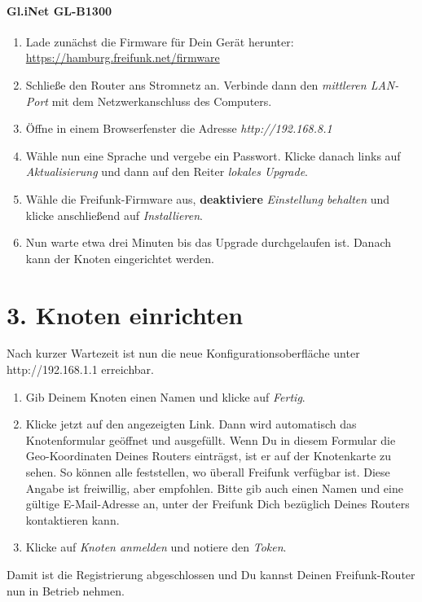 \documentclass[10pt,a4paper,notumble]{leaflet}
\begin{document}
\paragraph{Gl.iNet GL-B1300}
\begin{enumerate}
 \item Lade zunächst die Firmware für Dein Gerät herunter: \mbox{\href{https://hamburg.freifunk.net/firmware}{https://hamburg.freifunk.net/firmware}}
 \item Schließe den Router ans Stromnetz an. Verbinde dann den \textit{mittleren LAN-Port} mit dem Netzwerkanschluss des Computers.
 \item Öffne in einem Browserfenster die Adresse \textit{http://192.168.8.1}
 \item Wähle nun eine Sprache und vergebe ein Passwort. Klicke danach links auf \textit{Aktualisierung} und dann auf den Reiter \textit{lokales Upgrade}.
 \item Wähle die Freifunk-Firmware aus, \textbf{deaktiviere} \textit{Einstellung behalten} und klicke anschließend auf \textit{Installieren}.
 \item Nun warte etwa drei Minuten bis das Upgrade durchgelaufen ist. Danach kann der Knoten eingerichtet werden.
\end{enumerate}


\newpage

\section{3. Knoten einrichten}
Nach kurzer Wartezeit ist nun die neue Konfigurationsoberfläche unter http://192.168.1.1 erreichbar.

\begin{enumerate}
 \item Gib Deinem Knoten einen Namen und klicke auf \textit{Fertig}.
 \item Klicke jetzt auf den angezeigten Link. Dann wird automatisch das Knotenformular geöffnet und ausgefüllt. Wenn Du in diesem Formular die Geo-Koordinaten Deines Routers einträgst, ist er auf der Knotenkarte zu sehen. So können alle feststellen, wo überall Freifunk verfügbar ist. Diese Angabe ist freiwillig, aber empfohlen. Bitte gib auch einen Namen und eine gültige E-Mail-Adresse an, unter der Freifunk Dich bezüglich Deines Routers kontaktieren kann.
 \item Klicke auf \textit{Knoten anmelden} und notiere den \textit{Token}.
\end{enumerate}
Damit ist die Registrierung abgeschlossen und Du kannst Deinen Freifunk-Router nun in Betrieb nehmen.
\end{document}
